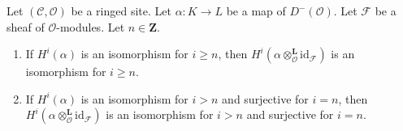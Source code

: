 \begin{lemma}
\label{lemma-induced-map}
Let $(\mathcal{C}, \mathcal{O})$ be a ringed site.
Let $\alpha : K \to L$ be a map of $D^-(\mathcal{O})$.
Let $\mathcal{F}$ be a sheaf of $\mathcal{O}$-modules.
Let $n \in \mathbf{Z}$.
\begin{enumerate}
\item If $H^i(\alpha)$ is an isomorphism for $i \geq n$,
then $H^i(\alpha \otimes_\mathcal{O}^\mathbf{L} \text{id}_\mathcal{F})$
is an isomorphism for $i \geq n$.
\item If $H^i(\alpha)$ is an isomorphism for $i > n$ 
and surjective for $i = n$,
then $H^i(\alpha \otimes_\mathcal{O}^\mathbf{L} \text{id}_\mathcal{F})$
is an isomorphism for $i > n$ and surjective for $i = n$.
\end{enumerate}
\end{lemma}